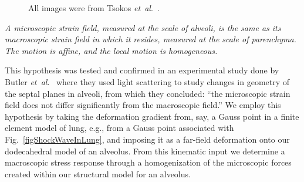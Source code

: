 \begin{figure}
    \centering
    \hfill
    \hfill
    \caption{All images were from Tsokos \textit{et~al}.\ \cite{Tsokosetal03}.}
    \label{figAlveolarDamage}
\end{figure}

\begin{conj}
\textit{A micro\-scopic strain field, measured at the scale of alveoli, is the same as its macro\-scopic strain field in which it resides, measured at the scale of parenchyma.  The motion is affine, and the local motion is homogeneous.}  
\label{conjecture}
\end{conj}

This hypothesis was tested and confirmed in an experimental study done by Butler \textit{et~al}.\ \cite{Butleretal96} where they used light scattering to study changes in geometry of the septal planes in alveoli, from which they concluded: ``the micro\-scopic strain field does not differ significantly from the macro\-scopic field.''  We employ this hypothesis by taking the deformation gradient from, say, a Gauss point in a finite element model of lung, e.g., from a Gauss point associated with Fig.~\ref{figShockWaveInLung}, and imposing it as a far-field deformation onto our dodecahedral model of an alveolus.  From this kinematic input we determine a macro\-scopic stress response through a homogenization of the micro\-scopic forces created within our structural model for an alveolus.

